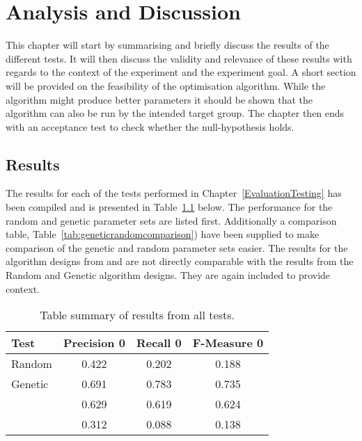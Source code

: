\chapter{Analysis and Discussion} %

\label{AnalysisAndDiscussion}

This chapter will start by summarising and briefly discuss the results of the different tests. It will then discuss the validity and relevance of these results with regards to the context of the experiment and the experiment goal. A short section will be provided on the feasibility of the optimisation algorithm. While the algorithm might produce better parameters it should be shown that the algorithm can also be run by the intended target group. The chapter then ends with an acceptance test to check whether the null-hypothesis holds.

\section{Results}
\label{Results}
The results for each of the tests performed in Chapter~\ref{EvaluationTesting} has been compiled and is presented in Table~\ref{tab:summarytableresults} below. The performance for the random and genetic parameter sets are listed first. Additionally a comparison table, Table~\ref{tab:geneticrandomcomparison}) have been supplied to make comparison of the genetic and random parameter sets easier. The results for the algorithm designs from \citeauthor{Moe2014compact} and \citeauthor{Oren1998} are not directly comparable with the results from the Random and Genetic algorithm designs. They are again included to provide context.

\begin{table}[H]
\begin{center}
\begin{tabular}{|l|ccc|}
\hline
Test & Precision 0 & Recall 0 & F-Measure 0\\ 
\hline
Random 						&   0.422& 	  0.202& 	0.188\\ 
Genetic 					&   0.691&    0.783&    0.735\\
\citeauthor{Moe2014compact} &   0.629&    0.619&    0.624\\ 
\citeauthor{Oren1998}		&   0.312&    0.088&    0.138\\ 
\hline
\end{tabular}
\end{center}
\caption{Table summary of results from all tests.}
\label{tab:summarytableresults}
\end{table}

